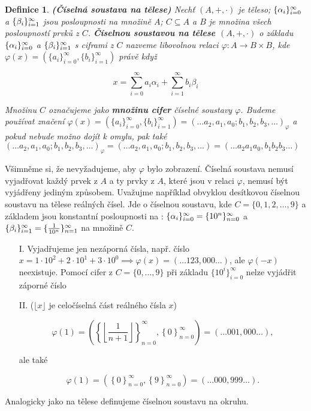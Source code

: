 \documentclass[12pt]{book}
\newtheorem{definice}{Definice}
\begin{document}
\begin{definice}\label{d2} \textbf{(Číselná soustava na tělese)}
	Nechť $(A,+,\cdot)$ je těleso; $\{\alpha_i\}_{i=0}^{\infty}$ a $\{\beta_i\}_{i=1}^{\infty}$ jsou posloupnosti na množině $A$; $C\subseteq A$ a $B$ je množina všech posloupností prvků z $C$.
	\textbf{Číselnou soustavou na tělese $(A,+,\cdot)$} o základu $\{\alpha_i\}_{i=0}^{\infty}$ a $\{\beta_i\}_{i=1}^{\infty}$ s ciframi z $C$ nazveme libovolnou relaci $\varphi : A \rightarrow B\times B$, kde 	$\varphi(x)=\left(\{a_{i}\}_{i=0}^{\infty},\{b_{i}\}_{i=1}^{\infty}\right)$ právě když
	
	$$x = \sum_{i=0}^{\infty} a_{i}\alpha_{i} + \sum_{i=1}^{\infty} b_{i}\beta_{i}$$
	
	Množinu $C$ označujeme jako \textbf{množinu cifer} číselné soustavy $\varphi$. Budeme používat značení $\varphi(x) = \left(\{a_{i}\}_{i=0}^{\infty},\{b_{i}\}_{i=1}^{\infty}\right) = (\dots a_2,a_1,a_0;b_1, b_2, b_3, \dots)_{\varphi}$ a pokud nebude možno dojít k omylu, pak také $(\dots a_2,a_1,a_0;b_1, b_2, b_3, \dots)_{\varphi} = (\dots a_2,a_1,a_0;b_1, b_2, b_3, \dots) = (\dots a_2a_1a_0,b_1 b_2 b_3 \dots)$
\end{definice}

Všimněme si, že nevyžadujeme, aby $\varphi$ bylo zobrazení. Číselná soustava nemusí vyjadřovat každý prvek z $A$ a ty prvky z $A$, které jsou v relaci $\varphi$, nemusí být vyjádřeny jediným způsobem. Uvažujme například obvyklou desítkovou číselnou soustavu na tělese reálných čísel. Jde o číselnou soustavu, kde $C = \{0, 1, 2, \dots, 9\}$ a základem jsou konstantní posloupnosti na : $\{\alpha_i\}_{i=0}^{\infty} = \{10^n\}_{n = 0}^{\infty}$ a $\{\beta_i\}_{i=1}^{\infty} = \{\frac{1}{10^n}\}_{n = 1}^{\infty}$ na množině $C$. 

\begin{enumerate}
	
\item[I.] Vyjadřujeme jen nezáporná čísla, např. číslo $x = 1\cdot10^2 + 2\cdot10^1 + 3\cdot10^0 \implies \varphi(x) = (\dots123,000\dots)$, ale $\varphi(-x)$ neexistuje. Pomocí cifer z $C=\{0,\dots,9\}$ při základu $\{10^i\}_{i=0}^{\infty}$ nelze vyjádřit záporné číslo

\item[II.] ($\lfloor x\rfloor$ je celočíselná část reálného čísla $x$)  

$$\varphi(1) = \left(  \left\{ \left\lfloor\frac{1}{n+1} \right\rfloor \right\}_{n = 0}^{\infty} , \left\{ 0 \right\}_{n = 0}^{\infty} \right) = \left(\dots 001,000 \dots \right),$$

ale také

$$\varphi(1) = \left(  \left\{ 0 \right\}_{n = 0}^{\infty} , \left\{ 9 \right\}_{n = 0}^{\infty} \right) = \left(\dots 000,999 \dots \right).$$

\end{enumerate}
Analogicky jako na tělese definujeme číselnou soustavu na okruhu.
\end{document}
